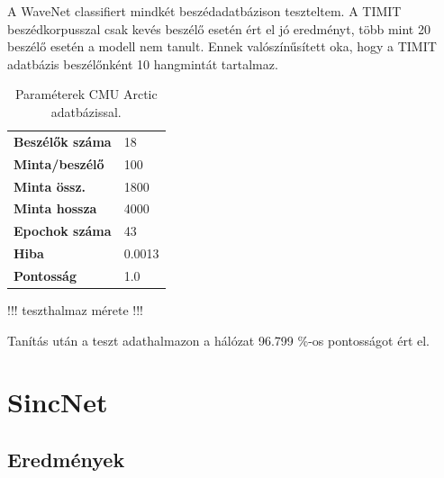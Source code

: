 A WaveNet classifiert mindkét beszédadatbázison teszteltem. A TIMIT beszédkorpusszal csak kevés beszélő esetén ért el jó eredményt, több mint 20 beszélő esetén a modell nem tanult. Ennek valószínűsített oka, hogy a TIMIT adatbázis beszélőnként 10 hangmintát tartalmaz.

\setlength\arrayrulewidth{0.6pt}

\begin{table}[!ht]
	\begin{tabular}{l|l} \toprule
		\bfseries Beszélők száma & 18 \\
		\rowcolor{gray!10}
		\bfseries Minta/beszélő & 100\\
		\bfseries Minta össz. & 1800 \\
		\rowcolor{gray!10}
		\bfseries Minta hossza & 4000 \\
		\bfseries Epochok száma & 43\\
		\rowcolor{gray!10}
		\bfseries Hiba & 0.0013 \\ 
		\bfseries Pontosság & 1.0 \\ 
		\bottomrule
		\hline
	\end{tabular}
	\centering
	\caption{Paraméterek CMU Arctic adatbázissal.}
	\label{fig:wavenet-arctic}
\end{table}

!!! teszthalmaz mérete !!!

Tanítás után a teszt adathalmazon a hálózat 96.799 \%-os pontosságot ért el.

\section{SincNet}



\subsection{Eredmények}